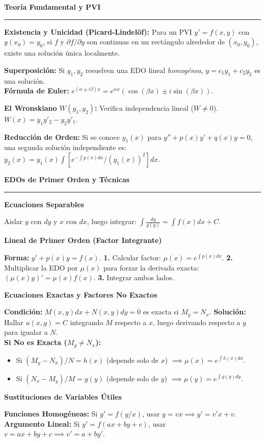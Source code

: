 \documentclass[10pt, landscape, twocolumn]{article}
\newcommand{\cheatsheetsection}[1]{
    \vspace{0.6em}
    {\color{themeblue}\large\bfseries #1} \par
    \vspace{-0.5em}
    {\color{themeblue}\rule{\linewidth}{1pt}} \par
    \vspace{0.2em}
}
\newcommand{\cheatsheetsubsection}[1]{
    \vspace{0.4em}
    {\color{themeblue}\normalsize\bfseries #1} \par
    \vspace{0.1em}
}
\begin{document}
\newpage
\cheatsheetsection{Teoría Fundamental y PVI}

\textbf{Existencia y Unicidad (Picard-Lindelöf):} Para un PVI $y' = f(x,y)$ con $y(x_0) = y_0$, si $f$ y $\partial f/\partial y$ son continuas en un rectángulo alrededor de $(x_0, y_0)$, existe una solución única localmente.

\textbf{Superposición:} Si $y_1, y_2$ resuelven una EDO lineal \textit{homogénea}, $y = c_1y_1 + c_2y_2$ es una solución. \\
\textbf{Fórmula de Euler:} $e^{(\alpha \pm i\beta)x} = e^{\alpha x}(\cos(\beta x) \pm i\sin(\beta x))$.

\textbf{El Wronskiano $W(y_1, y_2)$:} Verifica independencia lineal ($W \neq 0$). $W(x) = y_1 y'_2 - y_2 y'_1$.

\textbf{Reducción de Orden:} Si se conoce $y_1(x)$ para $y'' + p(x)y' + q(x)y = 0$, una segunda solución independiente es: $y_2(x) = y_1(x) \int [e^{-\int p(x)dx} / (y_1(x))^2] dx$.

\cheatsheetsection{EDOs de Primer Orden y Técnicas}

\cheatsheetsubsection{Ecuaciones Separables}
Aislar $y$ con $dy$ y $x$ con $dx$, luego integrar: $\int \frac{dy}{g(y)} = \int f(x)dx + C$.

\cheatsheetsubsection{Lineal de Primer Orden (Factor Integrante)}
\textbf{Forma:} $y' + p(x)y = f(x)$. \textbf{1.} Calcular factor: $\mu(x) = e^{\int p(x)dx}$. \textbf{2.} Multiplicar la EDO por $\mu(x)$ para forzar la derivada exacta: $(\mu(x)y)' = \mu(x)f(x)$. \textbf{3.} Integrar ambos lados.

\cheatsheetsubsection{Ecuaciones Exactas y Factores No Exactos}
\textbf{Condición:} $M(x,y)dx + N(x,y)dy = 0$ es exacta si $M_y = N_x$. \textbf{Solución:} Hallar $u(x,y) = C$ integrando $M$ respecto a $x$, luego derivando respecto a $y$ para igualar a $N$. \\
\textbf{Si No es Exacta ($M_y \neq N_x$):}
\begin{itemize}[leftmargin=*, nosep]
    \item Si $(M_y - N_x)/N = h(x)$ (depende solo de $x$) $\implies \mu(x) = e^{\int h(x)dx}$.
    \item Si $(N_x - M_y)/M = g(y)$ (depende solo de $y$) $\implies \mu(y) = e^{\int g(y)dy}$.
\end{itemize}

\cheatsheetsubsection{Sustituciones de Variables Útiles}
\textbf{Funciones Homogéneas:} Si $y' = f(y/x)$, usar $y = vx \implies y' = v'x + v$. \\
\textbf{Argumento Lineal:} Si $y' = f(ax+by+c)$, usar $v = ax+by+c \implies v' = a + by'$.
\end{document}
